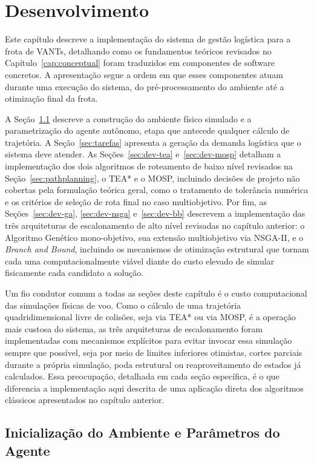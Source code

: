 \chapter{Desenvolvimento}\label{cap:development}


Este capítulo descreve a implementação do sistema de gestão logística para a frota de VANTs, detalhando como os fundamentos teóricos revisados no Capítulo~\ref{cap:conceptual} foram traduzidos em componentes de software concretos. A apresentação segue a ordem em que esses componentes atuam durante uma execução do sistema, do pré-processamento do ambiente até a otimização final da frota.

A Seção~\ref{sec:ambiente-agente} descreve a construção do ambiente físico simulado e a parametrização do agente autônomo, etapa que antecede qualquer cálculo de trajetória. A Seção~\ref{sec:tarefas} apresenta a geração da demanda logística que o sistema deve atender. As Seções~\ref{sec:dev-tea} e~\ref{sec:dev-mosp} detalham a implementação dos dois algoritmos de roteamento de baixo nível revisados na Seção~\ref{sec:pathplanning}, o TEA* e o MOSP, incluindo decisões de projeto não cobertas pela formulação teórica geral, como o tratamento de tolerância numérica e os critérios de seleção de rota final no caso multiobjetivo. Por fim, as Seções~\ref{sec:dev-ga}, \ref{sec:dev-nsga} e~\ref{sec:dev-bb} descrevem a implementação das três arquiteturas de escalonamento de alto nível revisadas no capítulo anterior: o Algoritmo Genético mono-objetivo, sua extensão multiobjetivo via NSGA-II, e o \textit{Branch and Bound}, incluindo os mecanismos de otimização estrutural que tornam cada uma computacionalmente viável diante do custo elevado de simular fisicamente cada candidato a solução.

Um fio condutor comum a todas as seções deste capítulo é o custo computacional das simulações físicas de voo. Como o cálculo de uma trajetória quadridimensional livre de colisões, seja via TEA* ou via MOSP, é a operação mais custosa do sistema, as três arquiteturas de escalonamento foram implementadas com mecanismos explícitos para evitar invocar essa simulação sempre que possível, seja por meio de limites inferiores otimistas, cortes parciais durante a própria simulação, poda estrutural ou reaproveitamento de estados já calculados. Essa preocupação, detalhada em cada seção específica, é o que diferencia a implementação aqui descrita de uma aplicação direta dos algoritmos clássicos apresentados no capítulo anterior.

\section{Inicialização do Ambiente e Parâmetros do Agente}\label{sec:ambiente-agente}


